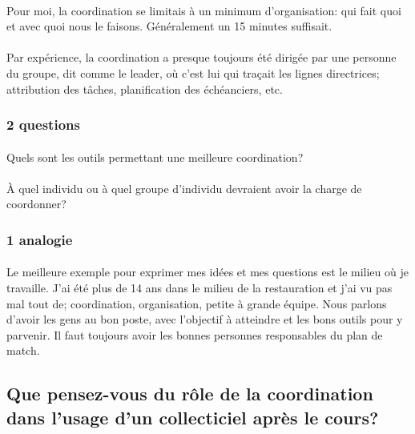 \documentclass[12pt]{article}
\begin{document}
\paragraph{}
Pour moi, la coordination se limitais à un minimum d'organisation: qui fait quoi et avec quoi nous le faisons. Généralement un 15 minutes suffisait.

\paragraph{}
Par expérience, la coordination a presque toujours été dirigée par une personne du groupe, dit comme le leader, où c'est lui qui traçait les lignes directrices; attribution des tâches, planification des échéanciers, etc. 

\subsubsection{2 questions}
\paragraph{}
Quels sont les outils permettant une meilleure coordination?

\paragraph{}
À quel individu ou à quel groupe d'individu devraient avoir la charge de coordonner?

\subsubsection{1 analogie}
\paragraph{}
Le meilleure exemple pour exprimer mes idées et mes questions est le milieu où je travaille. J'ai été plus de 14 ans dans le milieu de la restauration et j'ai vu pas mal tout de; coordination, organisation, petite à grande équipe. Nous parlons d'avoir les gens au bon poste, avec l'objectif à atteindre et les bons outils pour y parvenir. Il faut toujours avoir les bonnes personnes responsables du plan de match.

\subsection{Que pensez-vous du rôle de la coordination dans l'usage d'un collecticiel après le cours?}
\begin{comment}
- 3 idées (développez)
- 2 questions
- 1 analogie
Expliquez comment vos nouvelles réponses sont reliées à vos réponses initiales
\end{comment}
\end{document}
